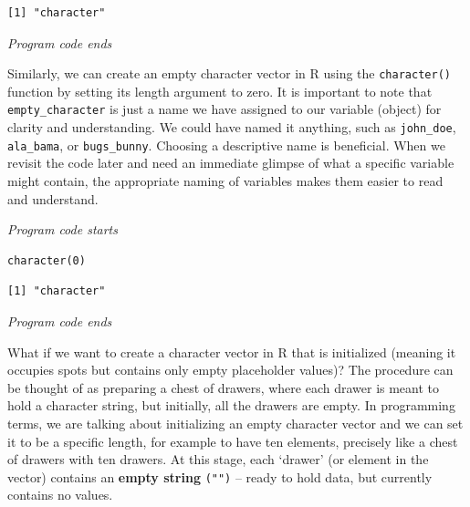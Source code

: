 \begin{verbatim}
[1] "character"
\end{verbatim}

\emph{Program code ends}

Similarly, we can create an empty character vector in R using the
\texttt{character()} function by setting its length argument to zero. It
is important to note that \texttt{empty\_character} is just a name we
have assigned to our variable (object) for clarity and understanding. We
could have named it anything, such as \texttt{john\_doe},
\texttt{ala\_bama}, or \texttt{bugs\_bunny}. Choosing a descriptive name
is beneficial. When we revisit the code later and need an immediate
glimpse of what a specific variable might contain, the appropriate naming of
variables makes them easier to read and understand.

\emph{Program code starts}

\begin{Shaded}
\begin{Highlighting}[]
\OtherTok{\textless{}{-}} \NormalTok{(} \NormalTok{)}

\end{Highlighting}
\end{Shaded}

\begin{verbatim}
character(0)
\end{verbatim}

\begin{Shaded}
\begin{Highlighting}[]
\end{Highlighting}
\end{Shaded}

\begin{verbatim}
[1] "character"
\end{verbatim}

\emph{Program code ends}

What if we want to create a character vector in R that is initialized
(meaning it occupies spots but contains only empty placeholder values)?
The procedure can be thought of as preparing a chest of drawers, where
each drawer is meant to hold a character string, but initially, all the
drawers are empty. In programming terms, we are talking about
initializing an empty character vector and we can set it to be a specific
length, for example to have ten elements, precisely like a chest of drawers with
ten drawers. At this stage, each `drawer' (or element in the vector)
contains an \textbf{empty string} \texttt{("")} -- ready to hold data,
but currently contains no values.

